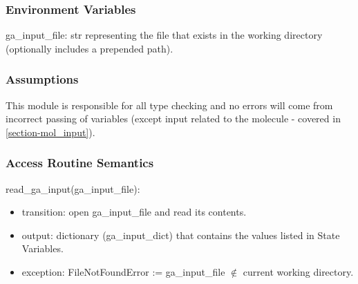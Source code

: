 \documentclass[12pt, titlepage]{article}
\begin{document}

\subsubsection{Environment Variables}

ga\_input\_file: str representing the file that exists in the working directory 
(optionally includes a prepended path).

\subsubsection{Assumptions}

This module is responsible for all type checking and no errors will come from 
incorrect passing of variables (except input related to the molecule - covered 
in \ref{section-mol_input}).

\subsubsection{Access Routine Semantics}

\noindent read\_ga\_input(ga\_input\_file):
\begin{itemize}
	\item transition: open ga\_input\_file and read its contents.
	\item output: dictionary (ga\_input\_dict) that contains the values listed 
	in State Variables.
	\item exception: FileNotFoundError := ga\_input\_file $\notin$ current 
	working directory.
\end{itemize}
\end{document}
